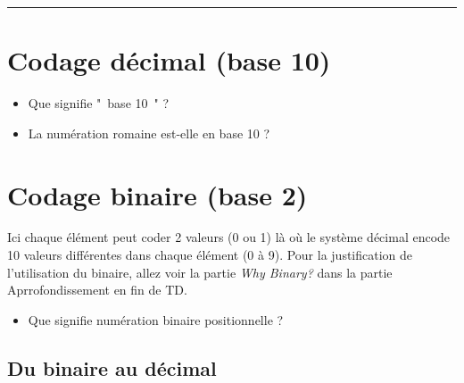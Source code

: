 
\newcommand{\numTD}{TD3}
\newcommand{\themeTD}{Codages Informatiques}


\hrule

\noindent{}



\section{Codage décimal (base 10)}
\begin{itemize}
 \item  Que signifie " base 10 " ?
 \item  La numération romaine est-elle en base 10 ?
\end{itemize}

\section{Codage binaire (base 2)}

 Ici chaque élément peut coder 2 valeurs (0 ou 1) là où le système décimal encode 10 valeurs différentes dans chaque élément (0 à 9). Pour la justification de l'utilisation du binaire, allez voir la partie \textit{Why Binary?} dans la partie Aprrofondissement en fin de TD.

\begin{itemize}
 \item  Que signifie numération binaire positionnelle ?
\end{itemize}
\subsection{Du binaire au décimal}

